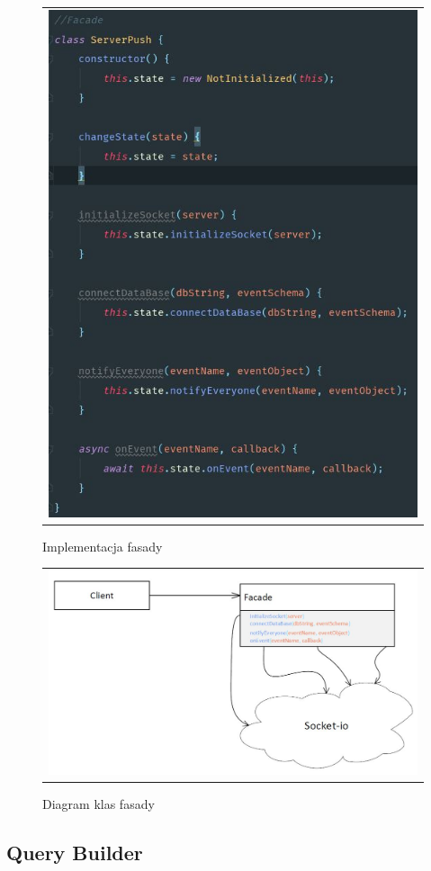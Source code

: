 \documentclass{sprawozdanie-agh}
\begin{document}
	\begin{figure}[H] 
		\centering
		\begin{tabular}{c}
			\includegraphics[width=.75\textwidth]{Fasada}
		\end{tabular} 
		\caption{Implementacja fasady}
	\end{figure}
	
	\begin{figure}[H] 
		\centering
		\begin{tabular}{c}
			\includegraphics[width=.75\textwidth]{Fasadaclass}
		\end{tabular} 
		\caption{Diagram klas fasady}
	\end{figure}
	
	\subsection{Query Builder}
	
\end{document}
